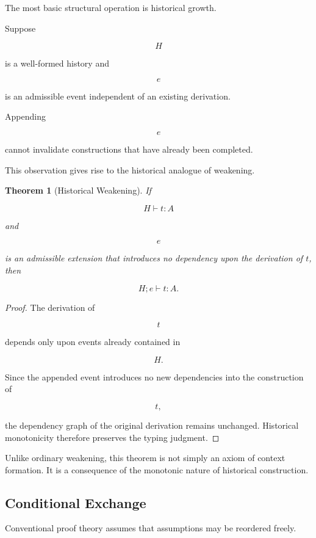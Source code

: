 \documentclass[12pt,oneside]{article}
\newtheorem{theorem}{Theorem}[section]
\theoremstyle{definition}
\theoremstyle{remark}
\begin{document}
The most basic structural operation is historical growth.

Suppose

\[
H
\]

is a well-formed history and

\[
e
\]

is an admissible event independent of an existing derivation.

Appending

\[
e
\]

cannot invalidate constructions that have already been completed.

This observation gives rise to the historical analogue of weakening.

\begin{theorem}[Historical Weakening]

If

\[
H
\vdash
t:A
\]

and

\[
e
\]

is an admissible extension that introduces no dependency upon the derivation of
\(t\), then

\[
H;e
\vdash
t:A.
\]

\end{theorem}

\begin{proof}

The derivation of

\[
t
\]

depends only upon events already contained in

\[
H.
\]

Since the appended event introduces no new dependencies into the construction of

\[
t,
\]

the dependency graph of the original derivation remains unchanged. Historical
monotonicity therefore preserves the typing judgment.

\end{proof}

Unlike ordinary weakening, this theorem is not simply an axiom of context
formation. It is a consequence of the monotonic nature of historical
construction.

\subsection{Conditional Exchange}

Conventional proof theory assumes that assumptions may be reordered freely.
\end{document}
